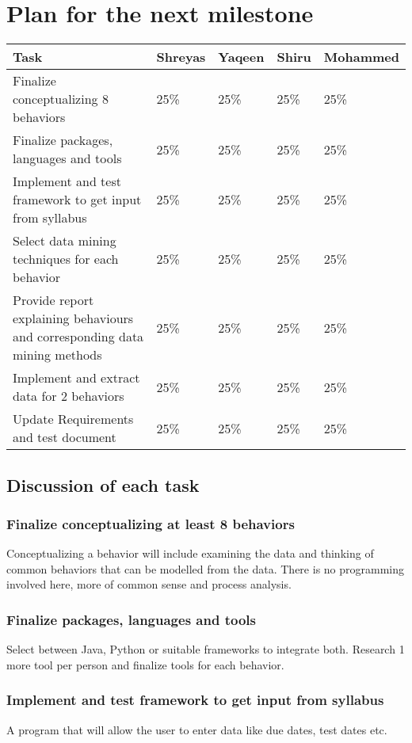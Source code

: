\documentclass[12pt]{article}
\begin{document}
	\section{Plan for the next milestone}
	\begin{tabularx}{\linewidth}{|X|X|X|X|X|}
	\hline
		\textbf{Task} & \textbf{Shreyas} & \textbf{Yaqeen} & \textbf{Shiru} & \textbf{Mohammed} \\
		\hline
		Finalize conceptualizing 8 behaviors & 25\% & 25\% & 25\% & 25\% \\ \hline
		Finalize packages, languages and tools & 25\% & 25\% & 25\% & 25\% \\ \hline
		Implement and test framework to get input from syllabus & 25\% & 25\% & 25\% & 25\%\\ \hline
		Select data mining techniques for each behavior & 25\% & 25\% & 25\% & 25\% \\ \hline
		Provide report explaining behaviours and corresponding data mining methods &25\% & 25\% & 25\% & 25\%\\ \hline
		Implement and extract data for 2 behaviors &25\% & 25\% & 25\% & 25\%\\ \hline
		Update Requirements and test document & 25\% & 25\% & 25\% & 25\%\\ 
		\hline
	\end{tabularx}

	\subsection{Discussion of each task}
	\subsubsection{Finalize conceptualizing at least 8 behaviors } \label{behs}
	Conceptualizing a behavior will include examining the data and thinking of common behaviors that can be modelled from the data. There is no programming involved here, more of common sense and process analysis.
	\subsubsection{Finalize packages, languages and tools}
	Select between Java, Python or suitable frameworks to integrate both. Research 1 more tool per person and finalize tools for each behavior. 
	\subsubsection{Implement and test framework to get input from syllabus}
	A program that will allow the user to enter data like due dates, test dates etc.
\end{document}
